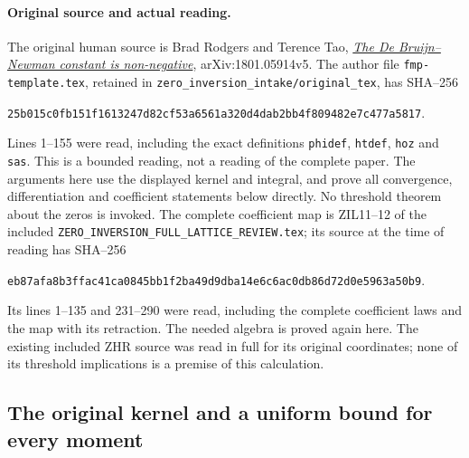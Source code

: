 \documentclass[11pt]{article}
\theoremstyle{definition}
\begin{document}
\paragraph{Original source and actual reading.}
The original human source is Brad Rodgers and Terence Tao,
\href{https://arxiv.org/abs/1801.05914v5}{\emph{The De Bruijn--Newman
constant is non-negative}}, arXiv:1801.05914v5. The author file
\texttt{fmp-template.tex}, retained in
\texttt{zero\_inversion\_intake/original\_tex}, has SHA--256
\begin{center}\small
\texttt{25b015c0fb151f1613247d82cf53a6561a320d4dab2bb4f809482e7c477a5817}.
\end{center}
Lines 1--155 were read, including the exact definitions
\texttt{phidef}, \texttt{htdef}, \texttt{hoz} and \texttt{sas}.
This is a bounded reading, not a reading of the complete paper.
The arguments here use the displayed kernel and integral, and prove
all convergence, differentiation and coefficient statements below
directly. No threshold theorem about the zeros is invoked.
The complete coefficient map is ZIL11--12 of the included
\texttt{ZERO\_INVERSION\_FULL\_LATTICE\_REVIEW.tex}; its source at
the time of reading has SHA--256
\begin{center}\small
\texttt{eb87afa8b3ffac41ca0845bb1f2ba49d9dba14e6c6ac0db86d72d0e5963a50b9}.
\end{center}
Its lines 1--135 and 231--290 were read, including the complete
coefficient laws and the map with its retraction. The needed algebra
is proved again here. The existing included ZHR source was read in
full for its original coordinates; none of its threshold implications
is a premise of this calculation.

\subsection{The original kernel and a uniform bound for every moment}
\end{document}
